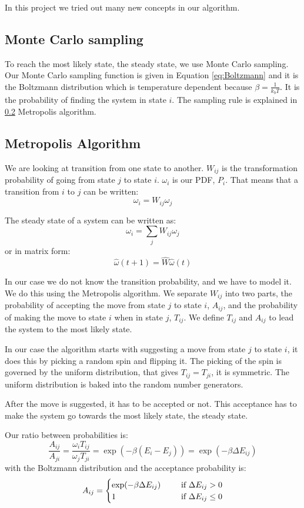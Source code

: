 In this project we tried out many new concepts in our algorithm.


\subsection{Monte Carlo sampling}

To reach the most likely state, the steady state, we use Monte Carlo sampling. Our Monte Carlo sampling function is given in Equation \ref{eq:Boltzmann} and it is the Boltzmann distribution which is temperature dependent because $\beta = \frac{1}{k_b T}$. It is the probability of finding the system in state $i$. The sampling rule is explained in \ref{sec:metropolis} Metropolis algorithm.

\subsection{Metropolis Algorithm}\label{sec:metropolis}

We are looking at transition from one state to another. $W_{ij}$ is the transformation probability of going from state $j$ to state $i$. $\omega_i$ is our PDF, $P_i$. That means that a transition from $i$ to $j$ can be written:
\[
\omega_i = W_{ij}\omega_j
\]

The steady state of a system can be written as:
\[
\omega_i = \sum_j W_{ij}\omega_{j}
\]
or in matrix form:
\[
\hat{\omega}(t+1) = \hat{W}\hat{\omega}(t)
\]

In our case we do not know the transition probability, and we have to model it. We do this using the Metropolis algorithm. We separate $W_{ij}$ into two parts, the probability of accepting the move from state $j$ to state $i$, $A_{ij}$, and the probability of making the move to state $i$ when in state $j$, $T_{ij}$. We define $T_{ij}$ and $A_{ij}$ to lead the system to the most likely state.

In our case the algorithm starts with suggesting a move from state $j$ to state $i$, it does this by picking a random spin and flipping it. The picking of the spin is governed by the uniform distribution, that gives $T_{ij }= T_{ji}$, it is symmetric. The uniform distribution is baked into the random number generators.

After the move is suggested, it has to be accepted or not. This acceptance has to make the system go towards the most likely state, the steady state.

Our ratio between probabilities is:
\[
\frac{A_{ij}}{A_{ji}} = \frac{\omega_iT_{ij}}{\omega_jT_{ji}} = \exp(-\beta (E_i-E_j))= \exp(-\beta \Delta E_{ij})
\]
with the Boltzmann distribution and the acceptance probability is:
\begin{equation}\label{eq:acceptance}
A_{ij} = \begin{cases}
\exp(-\beta \Delta E_{ij}) &\indent \text{if } \Delta E_{ij} > 0\\
1 & \indent\text{if } \Delta E_{ij} \leq 0\\
\end{cases}
\end{equation}


